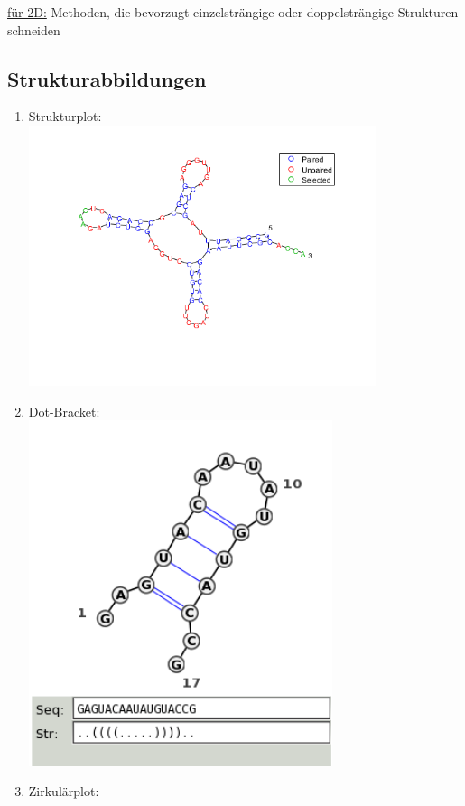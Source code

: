 \documentclass[12pt,a4paper]{article}
\begin{document}
\underline{für 2D:} Methoden, die bevorzugt einzelsträngige oder doppelsträngige Strukturen schneiden

\subsection{Strukturabbildungen}
\begin{enumerate}
	\item Strukturplot:\\
	\includegraphics[width=0.8\textwidth]{lectures/160404/pix/structure.png}
	\item Dot-Bracket:\\
	\includegraphics[width=0.7\textwidth]{lectures/160404/pix/dot_bracket.png}
	\item Zirkulärplot:\\

\end{enumerate}
\end{document}
